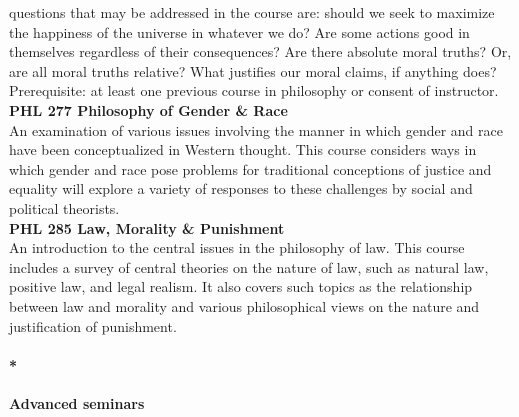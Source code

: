 \documentclass[
  letterpaper,
]{scrbook}
\let\oldparagraph\paragraph
\renewcommand{\paragraph}[1]{\oldparagraph{#1}\mbox{}}
\begin{document}
questions that may be addressed in the course are: should we seek to
maximize the happiness of the universe in whatever we do? Are some
actions good in themselves regardless of their consequences? Are there
absolute moral truths? Or, are all moral truths relative? What justifies
our moral claims, if anything does? Prerequisite: at least one previous
course in philosophy or consent of instructor.\\
\textbf{PHL 277 Philosophy of Gender \& Race}\\
An examination of various issues involving the manner in which gender
and race have been conceptualized in Western thought. This course
considers ways in which gender and race pose problems for traditional
conceptions of justice and equality will explore a variety of responses
to these challenges by social and political theorists.\\
\textbf{PHL 285 Law, Morality \& Punishment}\\
An introduction to the central issues in the philosophy of law. This
course includes a survey of central theories on the nature of law, such
as natural law, positive law, and legal realism. It also covers such
topics as the relationship between law and morality and various
philosophical views on the nature and justification of punishment.

\paragraph*{\texorpdfstring{\textbf{Advanced
seminars}}{Advanced seminars}}\label{advanced-seminars}
\end{document}
